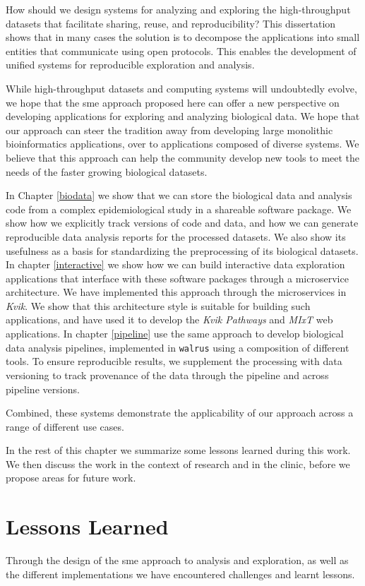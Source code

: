 How should we design systems for analyzing and exploring the high-throughput
datasets that facilitate sharing, reuse, and reproducibility? This dissertation
shows that in many cases the solution is to decompose the applications into
small entities that communicate using open protocols. This enables the
development of unified systems for reproducible exploration and analysis. 

While high-throughput datasets and computing systems will undoubtedly evolve, we
hope that the \gls{sme} approach proposed here can offer a new perspective on
developing applications for exploring and analyzing biological data. We hope
that our approach can steer the tradition away from developing large monolithic
bioinformatics applications, over to applications composed of diverse systems.
We believe that this approach can help the community develop new tools to meet
the needs of the faster growing biological datasets. 

In Chapter \ref{biodata} we show that we can store the biological data and
analysis code from a complex epidemiological study in a shareable software
package. We show how we explicitly track versions of code and data, and how we
can generate reproducible data analysis reports for the processed datasets. We
also show its usefulness as a basis for standardizing the preprocessing of its
biological datasets. In chapter \ref{interactive} we show how we can build
interactive data exploration applications that interface with these software
packages through a microservice architecture. We have implemented this approach
through the microservices in \emph{Kvik}. We show that this architecture style
is suitable for building such applications, and have used it to develop the
\emph{Kvik Pathways} and \emph{MIxT} web applications.  In chapter
\ref{pipeline} use the same approach to develop biological data analysis
pipelines, implemented in \texttt{walrus} using a composition of different
tools. To ensure reproducible results, we supplement the processing with data
versioning to track provenance of the data through the pipeline and across
pipeline versions. 

Combined, these systems demonstrate the applicability of our approach across a
range of different use cases. 

In the rest of this chapter we summarize some lessons learned during this
work. We then discuss the work in the context of research and in the clinic,
before we propose areas for future work. 


\section{Lessons Learned}
Through the design of the \gls{sme} approach to analysis and exploration, as
well as the different implementations we have encountered challenges and
learnt lessons.  

